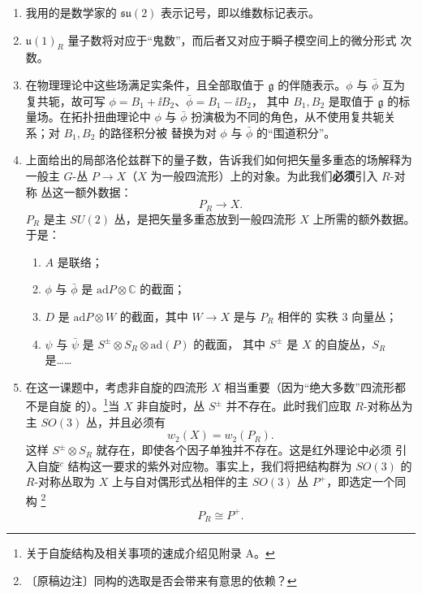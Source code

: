\begin{enumerate}[label=\arabic*., leftmargin=2.2em]
  \item 我用的是数学家的 $\mathfrak{su}(2)$ 表示记号，即以维数标记表示。

  \item $\mathfrak{u}(1)_R$ 量子数将对应于“鬼数”，而后者又对应于瞬子模空间上的微分形式
    次数。

  \item 在物理理论中这些场满足实条件，且全部取值于 $\mathfrak{g}$ 的伴随表示。$\phi$
    与 $\bar\phi$ 互为复共轭，故可写 $\phi=B_{1}+\ii B_{2}$、$\bar\phi=B_{1}-\ii B_{2}$，
    其中 $B_{1},B_{2}$ 是取值于 $\mathfrak{g}$ 的标量场。在拓扑扭曲理论中 $\phi$ 与
    $\bar\phi$ 扮演极为不同的角色，从不使用复共轭关系；对 $B_{1},B_{2}$ 的路径积分被
    替换为对 $\phi$ 与 $\bar\phi$ 的“围道积分”。

  \item 上面给出的局部洛伦兹群下的量子数，告诉我们如何把矢量多重态的场解释为一般主
    $G$-丛 $P\to X$（$X$ 为一般四流形）上的对象。为此我们\textbf{必须}引入 $R$-对称
    丛这一额外数据：
    \begin{equation}
      P_{R}\to X .
      \tag{4.8}
    \end{equation}
    $P_{R}$ 是主 $SU(2)$ 丛，是把矢量多重态放到一般四流形 $X$ 上所需的额外数据。于是：
    \begin{enumerate}[label=\arabic*., leftmargin=1.6em]
      \item $A$ 是联络；
      \item $\phi$ 与 $\bar\phi$ 是 $\mathrm{ad}P\otimes\mathbb{C}$ 的截面；
      \item $D$ 是 $\mathrm{ad}P\otimes W$ 的截面，其中 $W\to X$ 是与 $P_{R}$ 相伴的
        实秩 $3$ 向量丛；
      \item $\psi$ 与 $\bar\psi$ 是 $S^{\pm}\otimes S_{R}\otimes\mathrm{ad}(P)$ 的截面，
        其中 $S^{\pm}$ 是 $X$ 的自旋丛，$S_{R}$ 是……
    \end{enumerate}

  \item 在这一课题中，考虑非自旋的四流形 $X$ 相当重要（因为“绝大多数”四流形都不是自旋
    的）。\footnote{关于自旋结构及相关事项的速成介绍见附录 A。}当 $X$ 非自旋时，丛
    $S^{\pm}$ 并不存在。此时我们应取 $R$-对称丛为主 $SO(3)$ 丛，并且必须有
    \begin{equation}
      w_{2}(X)=w_{2}(P_{R}).
      \tag{4.9}
    \end{equation}
    这样 $S^{\pm}\otimes S_{R}$ 就存在，即使各个因子单独并不存在。这是红外理论中必须
    引入自旋$^c$ 结构这一要求的紫外对应物。事实上，我们将把结构群为 $SO(3)$ 的
    $R$-对称丛取为 $X$ 上与自对偶形式丛相伴的主 $SO(3)$ 丛 $P^{+}$，即选定一个同构
    \footnote{〔原稿边注〕同构的选取是否会带来有意思的依赖？}
    \begin{equation}
      P_{R}\cong P^{+}.
      \tag{4.10}
    \end{equation}
\end{enumerate}


